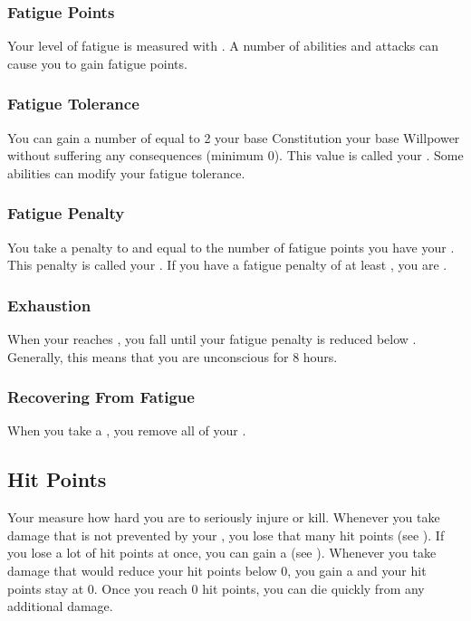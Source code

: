         \subsubsection{Fatigue Points}\label{Fatigue Points}
            Your level of fatigue is measured with .
            A number of abilities and attacks can cause you to gain fatigue points.

            \subsubsection{Fatigue Tolerance}\label{Fatigue Tolerance}
                You can gain a number of  equal to 2 \add your base Constitution \add your base Willpower without suffering any consequences (minimum 0).
                This value is called your .
                Some abilities can modify your fatigue tolerance.

            \subsubsection{Fatigue Penalty}\label{Fatigue Penalty}
                You take a penalty to  and  equal to the number of fatigue points you have \sub your .
                This penalty is called your .
                If you have a fatigue penalty of at least , you are .

        \subsubsection{Exhaustion}\label{Exhaustion}
            When your  reaches , you fall  until your fatigue penalty is reduced below .
            Generally, this means that you are unconscious for 8 hours.

        \subsubsection{Recovering From Fatigue}
            When you take a , you remove all of your .

    \subsection{Hit Points}\label{Hit Points}
        Your  measure how hard you are to seriously injure or kill.
        Whenever you take damage that is not prevented by your , you lose that many hit points (see ).
        If you lose a lot of hit points at once, you can gain a  (see ).
        Whenever you take damage that would reduce your hit points below 0, you gain a  and your hit points stay at 0.
        Once you reach 0 hit points, you can die quickly from any additional damage.

